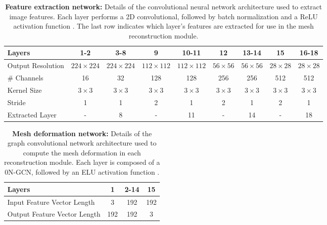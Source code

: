 \documentclass{article}
\begin{document}
\begin{table*}[ht]
\centering
\begin{tabular}{|l|c|c|c|c|c|c|c|c|}
\hline
Layers          & 1-2 & 3-8 & 9   & 10-11 & 12  & 13-14 & 15  & 16-18 \\ \hline
Output Resolution    & $224\times224$ & $224\times224$ & $112\times112$   & $112\times112$ & $56\times56$  & $56\times56$ & $28\times28$  & $28\times28$ \\ \hline
\# Channels     & 16  & 32  & 128 & 128   & 256 & 256   & 512 & 512   \\ \hline
Kernel Size     & $3\times3$ & $3\times3$ & $3\times3$ & $3\times3$ & $3\times3$ & $3\times3$ & $3\times3$ & $3\times3$  \\ \hline
Stride     & 1   & 1   & 2   & 1     & 2   & 1     & 2   & 1     \\ \hline
Extracted Layer & -   & 8   & -   & 11    & -   & 14    & -   & 18    \\ \hline
\end{tabular}
\caption{\textbf{Feature extraction network:} Details of the convolutional neural network architecture used to extract image features. Each layer performs a 2D convolutional, followed by batch normalization \cite{ioffe2015batch} and a ReLU activation function \cite{nair2010rectified}. The last row indicates which layer's features are extracted for use in the mesh reconstruction module.}
\label{table:VGG}
\end{table*}

\begin{table*}[ht]
\centering
\begin{tabular}{|l|c|c|c|}
\hline
Layers                       & 1   & 2-14 & 15  \\ \hline
Input Feature Vector Length  & 3   & 192  & 192 \\ \hline
Output Feature Vector Length & 192 & 192  & 3   \\ \hline
\end{tabular}
\caption{\textbf{Mesh deformation network:} Details of the graph convolutional network architecture used to compute the mesh deformation in each reconstruction module. Each layer is composed of a 0N-GCN, followed by an ELU activation function \cite{clevert2015fast}.}
\label{table:MeshDeform}
\end{table*}
\end{document}
